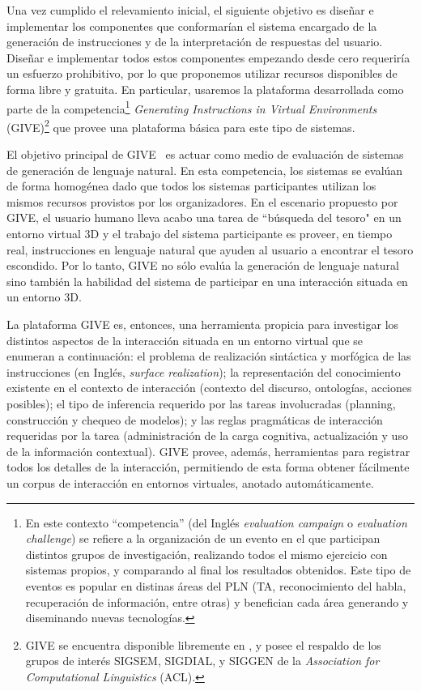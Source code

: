 Una vez cumplido el relevamiento inicial, el siguiente objetivo es
dise\~nar e implementar los componentes que
conformar\'ian el sistema encargado de la generaci\'on de instrucciones
y de la interpretaci\'on de respuestas del usuario.
Dise\~nar e implementar todos estos componentes empezando desde cero
requerir\'ia un esfuerzo prohibitivo, por lo que proponemos utilizar recursos
disponibles de forma libre y gratuita. En particular, usaremos la plataforma
desarrollada como parte de la competencia\footnote{En este contexto
``competencia'' (del Ingl\'es \emph{evaluation campaign} o \emph{evaluation challenge})
se refiere a la organizaci\'on de un evento en el que participan distintos
grupos de investigaci\'on, realizando todos el mismo ejercicio con sistemas
propios, y comparando al final los resultados obtenidos. Este tipo
de eventos es popular en distinas \'areas del PLN (TA, reconocimiento del
habla, recuperaci\'on de informaci\'on, entre otras) y benefician
cada \'area generando y diseminando nuevas
tecnolog\'ias.} \emph{Generating Instructions in Virtual Environments}
(GIVE)\footnote{GIVE se encuentra disponible libremente en
, y posee el respaldo de los grupos de
inter\'es SIGSEM, SIGDIAL, y SIGGEN de la \emph{Association for Computational
Linguistics} (ACL).} que
provee una plataforma b\'asica para este tipo de sistemas.

El objetivo principal de GIVE~\citep{byron09} es actuar como medio de
evaluaci\'on de sistemas de generaci\'on
de lenguaje natural. En esta competencia, los sistemas se eval\'uan de forma
homog\'enea dado que todos los sistemas participantes utilizan los mismos
recursos provistos por los organizadores.
En el escenario propuesto por GIVE, el usuario
humano lleva acabo una tarea de ``b\'usqueda del tesoro" en un entorno
virtual 3D y el trabajo del sistema participante es proveer, en tiempo
real, instrucciones en lenguaje natural que ayuden al usuario
a encontrar el tesoro escondido.  Por lo tanto, GIVE no s\'olo eval\'ua
la generaci\'on de lenguaje natural sino tambi\'en la habilidad del
sistema de participar en una interacci\'on situada en un entorno 3D.

La plataforma GIVE es, entonces, una herramienta propicia para
investigar los distintos aspectos de la interacci\'on situada en un entorno
virtual que se enumeran a continuaci\'on: el problema de realizaci\'on
sint\'actica y morf\'ogica de las
instrucciones (en Ingl\'es, \emph{surface realization});
la representaci\'on del conocimiento existente en el contexto de
interacci\'on (contexto del discurso, ontolog\'ias, acciones posibles);
el tipo de inferencia requerido por las tareas involucradas
(planning, construcci\'on y chequeo de modelos); y
las reglas pragm\'aticas de interacci\'on requeridas por la tarea
(administraci\'on de la carga cognitiva, actualizaci\'on y uso de la
informaci\'on contextual). GIVE provee, adem\'as, 
herramientas para registrar todos los detalles de la
interacci\'on, permitiendo de esta forma obtener f\'acilmente un corpus de
interacci\'on en entornos virtuales, anotado autom\'aticamente.

